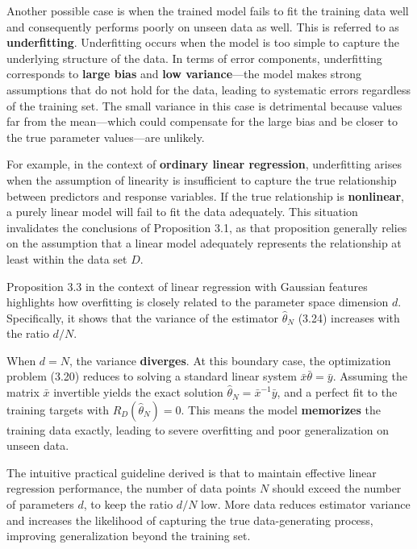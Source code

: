 \documentclass{report}
\begin{document}
Another possible case is when the trained model fails to fit the training data well and consequently performs poorly on unseen data as well. This is referred to as \textbf{underfitting}. Underfitting occurs when the model is too simple to capture the underlying structure of the data. In terms of error components, underfitting corresponds to \textbf{large bias} and \textbf{low variance}—the model makes strong assumptions that do not hold for the data, leading to systematic errors regardless of the training set. The small variance in this case is detrimental because values far from the mean—which could compensate for the large bias and be closer to the true parameter values—are unlikely.

For example, in the context of \textbf{ordinary linear regression}, underfitting arises when the assumption of linearity is insufficient to capture the true relationship between predictors and response variables. If the true relationship is \textbf{nonlinear}, a purely linear model will fail to fit the data adequately. This situation invalidates the conclusions of Proposition 3.1, as that proposition generally relies on the assumption that a linear model adequately represents the relationship at least within the data set $D$.

Proposition 3.3 in the context of linear regression with Gaussian features highlights how overfitting is closely related to the parameter space dimension $d$. Specifically, it shows that the variance of the estimator $\hat{\theta}_N$ (3.24) increases with the ratio $d/N$.

When $d = N$, the variance \textbf{diverges}. At this boundary case, the optimization problem (3.20) reduces to solving a standard linear system $\bar{x}\bar{\theta} = \bar{y}$. Assuming the matrix $\bar{x}$ invertible yields the exact solution $\hat{\theta}_N = \bar{x}^{-1}\bar{y}$, and a perfect fit to the training targets with $R_D(\hat{\theta}_N) = 0$. This means the model \textbf{memorizes} the training data exactly, leading to severe overfitting and poor generalization on unseen data.

The intuitive practical guideline derived is that to maintain effective linear regression performance, the number of data points $N$ should exceed the number of parameters $d$, to keep the ratio $d/N$ low. More data reduces estimator variance and increases the likelihood of capturing the true data-generating process, improving generalization beyond the training set.

\end{document}
